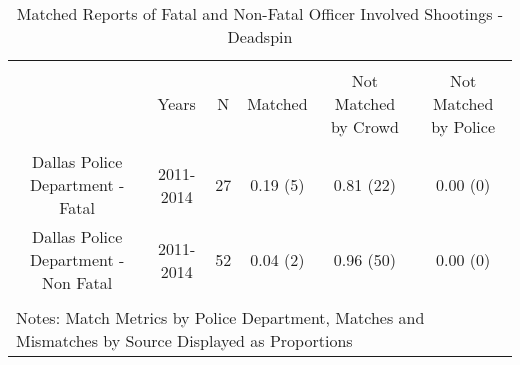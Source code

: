 
\begin{table}[!htbp] \centering 
  \caption{Matched Reports of Fatal and Non-Fatal Officer Involved Shootings - Deadspin} 
  \label{} 
\footnotesize 
\begin{tabular}{@{\extracolsep{5pt}} cccccc} 
\\[-1.8ex]\hline 
\hline \\[-1.8ex] 
 & Years & N & Matched & Not Matched by Crowd & Not Matched by Police \\ 
\hline \\[-1.8ex] 
Dallas Police Department - Fatal & 2011-2014 & 27 & 0.19 (5) & 0.81 (22) & 0.00 (0) \\ 
Dallas Police Department - Non Fatal & 2011-2014 & 52 & 0.04 (2) & 0.96 (50) & 0.00 (0) \\ 
\hline \\[-1.8ex] 
\multicolumn{6}{l}{Notes: Match Metrics by Police Department, Matches and Mismatches by Source Displayed as Proportions} \\ 
\end{tabular} 
\end{table}  
